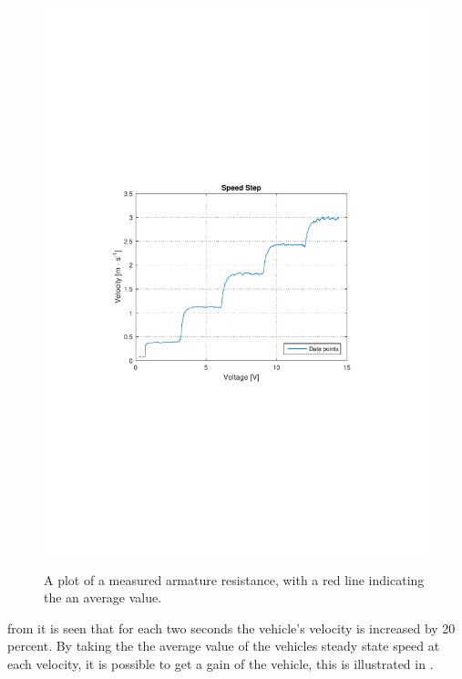 \begin{figure}[H]
  \centering
  {
    \includegraphics[width=1.4\textwidth]{figures/SpeedStep.pdf}
  }
  \caption{A plot of a measured armature resistance, with a red line indicating the an average value.}
  \label{SpeedStepGainTest}
\end{figure}

from  it is seen that for each two seconds the vehicle's velocity is increased by 20 percent. By taking the the average value of the vehicles steady state speed at each velocity, it is possible to get a gain of the vehicle, this is illustrated in .

